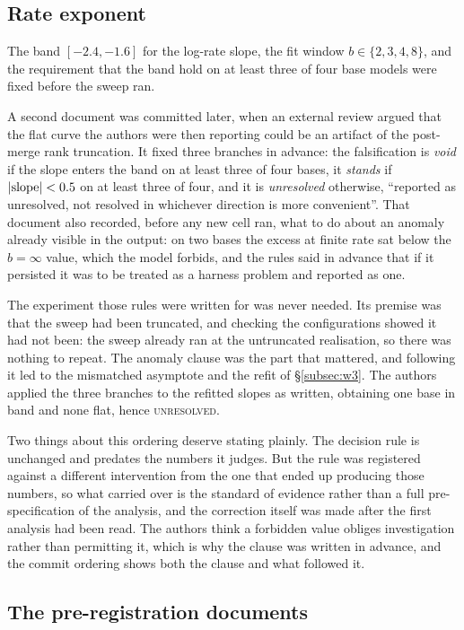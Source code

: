 \subsection{Rate exponent}\label{subsec:rate-prereg}

The band $[-2.4, -1.6]$ for the log-rate slope, the fit window
$b \in \{2,3,4,8\}$, and the requirement that the band hold on at least
three of four base models were fixed before the sweep ran.

A second document was committed later, when an external review argued that
the flat curve the authors were then reporting could be an artifact of the
post-merge rank truncation. It fixed three branches in advance: the
falsification is \emph{void} if the slope enters the band on at least
three of four bases, it \emph{stands} if $|{\rm slope}| < 0.5$ on at least
three of four, and it is \emph{unresolved} otherwise, ``reported as
unresolved, not resolved in whichever direction is more convenient''. That
document also recorded, before any new cell ran, what to do about an
anomaly already visible in the output: on two bases the excess at finite
rate sat below the $b = \infty$ value, which the model forbids, and the
rules said in advance that if it persisted it was to be treated as a
harness problem and reported as one.

The experiment those rules were written for was never needed. Its premise
was that the sweep had been truncated, and checking the configurations
showed it had not been: the sweep already ran at the untruncated
realisation, so there was nothing to repeat. The anomaly clause was the
part that mattered, and following it led to the mismatched asymptote and
the refit of \S\ref{subsec:w3}. The authors applied the three branches to the
refitted slopes as written, obtaining one base in band and none flat,
hence \textsc{unresolved}.

Two things about this ordering deserve stating plainly. The decision rule
is unchanged and predates the numbers it judges. But the rule was
registered against a different intervention from the one that ended up
producing those numbers, so what carried over is the standard of evidence
rather than a full pre-specification of the analysis, and the correction
itself was made after the first analysis had been read. The authors think a
forbidden value obliges investigation rather than permitting it, which is
why the clause was written in advance, and the commit ordering shows both
the clause and what followed it.

\subsection{The pre-registration documents}\label{subsec:prereg-docs}

